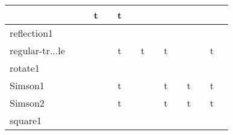 {\begin{longtable}{|l|*{7}{cr|}}
& \cellcolor{yellow!25} & \cellcolor{yellow!25}{ 56} 
& \cellcolor{green!40}t & \cellcolor{green!40}{\bf 78} 
& \cellcolor{green!20}t & \cellcolor{green!20}{ 307} 
\\ \hline
\cellcolor{blue!10}reflection1 
& \cellcolor{yellow!25} & \cellcolor{yellow!25}{ 4} 
& \cellcolor{yellow!25} & \cellcolor{yellow!25}{ 9} 
& \cellcolor{yellow!25} & \cellcolor{yellow!25}{ 8} 
& \cellcolor{yellow!25} & \cellcolor{yellow!25}{ 233} 
& \cellcolor{yellow!25} & \cellcolor{yellow!25}{ 61} 
& \cellcolor{yellow!25} & \cellcolor{yellow!25}{ 64} 
& \cellcolor{yellow!25} & \cellcolor{yellow!25}{ 230} 
\\ \hline
\cellcolor{blue!10}regular-tr$\ldots$le 
& \cellcolor{yellow!25} & \cellcolor{yellow!25}{ 5} 
& \cellcolor{yellow!25} & \cellcolor{yellow!25}{ 2} 
& \cellcolor{green!50}t & \cellcolor{green!50}{\bf 39} 
& \cellcolor{green!30}t & \cellcolor{green!30}{\sl 245} 
& \cellcolor{green!40}t & \cellcolor{green!40}{ 107} 
& \cellcolor{yellow!25} & \cellcolor{yellow!25}{ 87} 
& \cellcolor{green!30}t & \cellcolor{green!30}{ 243} 
\\ \hline
\cellcolor{blue!10}rotate1 
& \cellcolor{yellow!25} & \cellcolor{yellow!25}{ 3} 
& \cellcolor{yellow!25} & \cellcolor{yellow!25}{ 8} 
& \cellcolor{yellow!25} & \cellcolor{yellow!25}{ 12} 
& \cellcolor{yellow!25} & \cellcolor{yellow!25}{ 231} 
& \cellcolor{yellow!25} & \cellcolor{yellow!25}{ 70} 
& \cellcolor{yellow!25} & \cellcolor{yellow!25}{ 76} 
& \cellcolor{yellow!25} & \cellcolor{yellow!25}{ 299} 
\\ \hline
\cellcolor{blue!10}Simson1 
& \cellcolor{yellow!25} & \cellcolor{yellow!25}{ 4} 
& \cellcolor{yellow!25} & \cellcolor{yellow!25}{ 8} 
& \cellcolor{green!50}t & \cellcolor{green!50}{\bf 45} 
& \cellcolor{yellow!25} & \cellcolor{yellow!25}{ 674} 
& \cellcolor{green!30}t & \cellcolor{green!30}{\sl 279} 
& \cellcolor{green!30}t & \cellcolor{green!30}{ 159} 
& \cellcolor{green!20}t & \cellcolor{green!20}{ 966} 
\\ \hline
\cellcolor{blue!10}Simson2 
& \cellcolor{yellow!25} & \cellcolor{yellow!25}{ 3} 
& \cellcolor{yellow!25} & \cellcolor{yellow!25}{ 8} 
& \cellcolor{green!50}t & \cellcolor{green!50}{\bf 41} 
& \cellcolor{yellow!25} & \cellcolor{yellow!25}{ 707} 
& \cellcolor{green!30}t & \cellcolor{green!30}{\sl 233} 
& \cellcolor{green!30}t & \cellcolor{green!30}{ 183} 
& \cellcolor{green!20}t & \cellcolor{green!20}{ 942} 
\\ \hline
\cellcolor{blue!10}square1 
& \cellcolor{yellow!25} & \cellcolor{yellow!25}{ 2} 

\end{longtable}}
